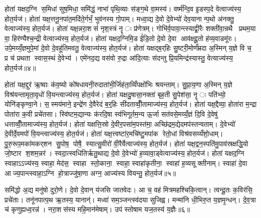 होता॑ यक्षद॒ग्नि स॒मिधा॑ सुष॒मिधा॒ समि॑द्धं॒ नाभा॑ पृथि॒व्याः स॑ङ्ग॒थे वा॒मस्य॑। वर्ष्म॑न्दि॒व इ॒डस्प॒दे वेत्वाज्य॑स्य॒ होत॒र्यज॑। होता॑ यक्ष॒त्तनू॒नपा॑त॒मदि॑ते॒र्गर्भं॒ भुव॑नस्य गो॒पाम्। मध्वा॒द्य दे॒वो दे॒वेभ्यो॑ देव॒यानान्प॒थो अ॑नक्तु॒ वेत्वाज्य॑स्य॒ होत॒र्यज॑। होता॑ यक्ष॒न्नरा॒शसं॑ नृश॒स्त्रं नॄः प्र॑णेत्रम्। गोभि॑र्व॒पावा॒न्त्स्याद्वी॒रैः शक्ती॑वा॒न्रथै प्रथम॒या वा॒ हिर॑ण्यैश्च॒न्द्री वेत्वाज्य॑स्य॒ होत॒र्यज॑। होता॑ यक्षद॒ग्निमि॒ड ई॑डि॒तो दे॒वो दे॒वा आव॑क्षद्दू॒तो ह॑व्य॒वाडमू॑रः। उपे॒मय्यँ॒ज्ञमुपे॒मां दे॒वो दे॒वहू॑तिमवतु॒ वेत्वाज्य॑स्य॒ होत॒र्यज॑। होता॑ यक्षद्ब॒र्‌हिः सु॒ष्टरी॒मोर्णं॑म्रदा अ॒स्मिन् य॒ज्ञे वि च॒ प्र च॑ प्रथता स्वास॒स्थं दे॒वेभ्य॑। एमे॑नद॒द्य वस॑वो रु॒द्रा आ॑दि॒त्याः स॑दन्तु प्रि॒यमिन्द्र॑स्यास्तु॒ वेत्याज्य॑स्य॒ होत॒र्यज॑॥४॥

होता॑ यक्ष॒द्दुर॑ ऋ॒ष्वाः क॑व॒ष्यो को॑षधावनी॒रुदाता॑भी॒र्जिह॑ता॒व्विँपक्षो॑भिः श्रयन्ताम्। सु॒प्रा॒य॒णा अ॒स्मिन् य॒ज्ञे विश्र॑यन्तामृता॒वृधो॑ वि॒यन्त्वाज्य॑स्य॒ होत॒र्यज॑। होता॑ यक्षदु॒षासा॒नक्ता॑ बृह॒ती सु॒पेश॑सा॒ नॄः पति॑भ्यो॒ योनि॑ङ्कृण्वा॒ने। स॒स्मय॑माने॒ इन्द्रे॑ण दे॒वैरेदं ब॒र्॒हिः सी॑दताव्वीँ॒तामाज्य॑स्य॒ होत॒र्यज॑। होता॑ यक्ष॒द्दैव्या॒ होता॑रा म॒न्द्रा पोता॑रा क॒वी प्रचे॑तसा। स्वि॑ष्टम॒द्यान्यः क॑रदि॒षा स्व॑भिगूर्तम॒न्य ऊ॒र्जा सत॑वसे॒मय्यँ॒ज्ञं दि॒वि दे॒वेषु॑ धत्ताव्वीँ॒तामाज्य॑स्य॒ होत॒र्यज॑। होता॑ यक्षत्ति॒स्रो दे॒वीर॒पसा॑म॒पस्त॑मा॒ अच्छि॑द्रम॒द्येदमप॑स्तन्वताम्। दे॒वेभ्यो॑ दे॒वीर्दे॒वमपो॑ वि॒यन्त्वाज्य॑स्य॒ होत॒र्यज॑। होता॑ यक्ष॒त्त्वष्टा॑र॒मचि॑ष्टु॒मपा॑क रेतो॒धां विश्र॑वसय्यँशो॒धाम्। पु॒रु॒रूप॒मका॑मकर्‌शन सु॒पोष॒ पोषै॒ स्यात्सु॒वीरो॑ वी॒रैर्वेत्वाज्य॑स्य॒ होत॒र्यज॑। होता॑ यक्ष॒द्वन॒स्पति॑मु॒पाव॑स्रक्षद्धि॒यो जो॒ष्टार श॒शम॒न्नर॑। स्वदा॒त्स्वधि॑तिर्\mbox{}ऋतु॒थाद्य दे॒वो दे॒वेभ्यो॑ ह॒व्यावा॒ड्वेत्वाज्य॑स्य॒ होत॒र्यज॑। होता॑ यक्षद॒ग्नि स्वाहाऽऽज्य॑स्य॒ स्वाहा॒ मेद॑स॒ स्वाहा स्तो॒काना॒ स्वाहा॒ स्वाहा॑कृतीना॒ स्वाहा॑ ह॒व्यसूक्तीनाम्। स्वाहा॑ दे॒वा आज्य॒पान्त्स्वाहा॒ऽग्नि हो॒त्राज्जु॑षा॒णा अग्न॒ आज्य॑स्य वियन्तु॒ होत॒र्यज॑॥५॥\anuvakamend[प्रि॒यमिन्द्र॑स्यास्तु॒ वेत्वाज्य॑स्य॒ होत॒र्यज॑ सु॒वीरो॑ वी॒रैर्वेत्वाज्य॑स्य॒ होत॒र्यज॑ च॒त्वारि॑ च (अ॒ग्निन्तनू॒नपा॑त॒न्नरा॒शस॑म॒ग्निमि॒ड ई॑डि॒तो ब॒र्‌हिर्दुर॑ उ॒षासा॒नक्ता॒ दैव्या॑ ति॒स्रस्त्वष्टा॑रं॒ वन॒स्पति॑म॒ग्निम्। पञ्च॒ वेत्वेको॑ वि॒यन्तु॒ द्विर्वी॒तामेको॑ वि॒यन्तु॒ द्विर्वेत्वेको॑ वियन्तु॒ होत॒र्यज॑ ॥ )]

समि॑द्धो अ॒द्य मनु॑षो दुरो॒णे। दे॒वो दे॒वान् य॑जसि जातवेदः। आ च॒ वह॑ मित्रमहश्चिकि॒त्वान्। त्वन्दू॒तः क॒विर॑सि॒ प्रचे॑ताः। तनू॑नपात्प॒थ ऋ॒तस्य॒ यानान्॑। मध्वा॑ सम॒ञ्जन्त्स्व॑दया सुजिह्व। मन्मा॑नि धी॒भिरु॒त य॒ज्ञमृ॒न्धन्। दे॒व॒त्रा च॑ कृणुह्यध्व॒रन्न॑। नरा॒शस॑स्य महि॒मान॑मेषाम्। उप॑ स्तोषाम यज॒तस्य॑ य॒ज्ञैः॥६॥

